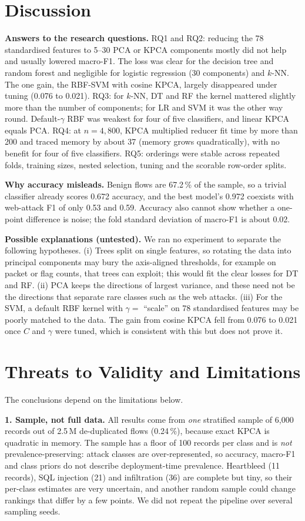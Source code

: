 \documentclass[runningheads]{llncs}
\begin{document}
\section{Discussion}
\textbf{Answers to the research questions.} RQ1 and RQ2: reducing the 78 standardised features to 5--30 PCA or KPCA components mostly did not help and usually lowered macro-F1. The loss was clear for the decision tree and random forest and negligible for logistic regression (30 components) and $k$-NN. The one gain, the RBF-SVM with cosine KPCA, largely disappeared under tuning (0.076 to 0.021). RQ3: for $k$-NN, DT and RF the kernel mattered slightly more than the number of components; for LR and SVM it was the other way round. Default-$\gamma$ RBF was weakest for four of five classifiers, and linear KPCA equals PCA. RQ4: at $n=4{,}800$, KPCA multiplied reducer fit time by more than 200 and traced memory by about 37 (memory grows quadratically), with no benefit for four of five classifiers. RQ5: orderings were stable across repeated folds, training sizes, nested selection, tuning and the scorable row-order splits.

\textbf{Why accuracy misleads.} Benign flows are 67.2\,\% of the sample, so a trivial classifier already scores 0.672 accuracy, and the best model's 0.972 coexists with web-attack F1 of only 0.53 and 0.59. Accuracy also cannot show whether a one-point difference is noise; the fold standard deviation of macro-F1 is about 0.02.

\textbf{Possible explanations (untested).} We ran no experiment to separate the following hypotheses. (i) Trees split on single features, so rotating the data into principal components may bury the axis-aligned thresholds, for example on packet or flag counts, that trees can exploit; this would fit the clear losses for DT and RF. (ii) PCA keeps the directions of largest variance, and these need not be the directions that separate rare classes such as the web attacks. (iii) For the SVM, a default RBF kernel with $\gamma=$ ``scale'' on 78 standardised features may be poorly matched to the data. The gain from cosine KPCA fell from 0.076 to 0.021 once $C$ and $\gamma$ were tuned, which is consistent with this but does not prove it.

\section{Threats to Validity and Limitations}
The conclusions depend on the limitations below.

\textbf{1. Sample, not full data.} All results come from \emph{one} stratified sample of 6{,}000 records out of 2.5\,M de-duplicated flows (0.24\,\%), because exact KPCA is quadratic in memory. The sample has a floor of 100 records per class and is \emph{not} prevalence-preserving: attack classes are over-represented, so accuracy, macro-F1 and class priors do not describe deployment-time prevalence. Heartbleed (11 records), SQL injection (21) and infiltration (36) are complete but tiny, so their per-class estimates are very uncertain, and another random sample could change rankings that differ by a few points. We did not repeat the pipeline over several sampling seeds.
\end{document}
